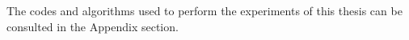 The codes and algorithms used to perform the experiments of this thesis can be consulted in the Appendix section.







